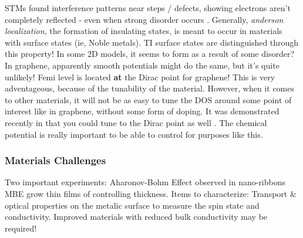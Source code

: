 \documentclass[../mattg_ti-fii_lit-review.tex]{subfiles}
\begin{document}
\begin{outline}
		\2 STMs found interference patterns near steps / defects, showing electrons aren't completely reflected - even when strong disorder occurs \cite{roushan_topological_2009,alpichshev_stm_2010, zhang_experimental_2009}. 
		\3 Generally, \textit{anderson localization}, the formation of insulating states, is meant to occur in materials with surface states (ie, Noble metals).
		\3 TI surface states are distinguished through this property! 
		\3 In some 2D models, it seems to form as a result of some disorder?
		\3 In graphene, apparently smooth potentials might do the same, but it's quite unlikely!
		\2 Femi level is located \textbf{at} the Dirac point for graphene! This is very adventageous, because of the tunability of the material. However, when it comes to other materials, it will not be as easy to tune the DOS around some point of interest like in graphene, without some form of doping. It was demonstrated recently in \bismuthselinide{} that you could tune to the Dirac point as well \cite{hsieh_tunable_2009}. The chemical potential is really important to be able to control for purposes like this. 	
		
	\end{outline}
	
	\subsubsection{Materials Challenges}
	\begin{outline}
		\1 Two important experiments:
		\2 Aharonov-Bohm Effect observed in nano-ribbons
		\2 MBE grow thin films of \bismuthselinide{} controlling thickness.
		\1 Items to characterize:
		\2 Transport \& optical properties on the metalic surface to measure the spin state and conductivity.
		\2 Improved materials with reduced bulk conductivity may be required!
	\end{outline}
	
\end{document}
